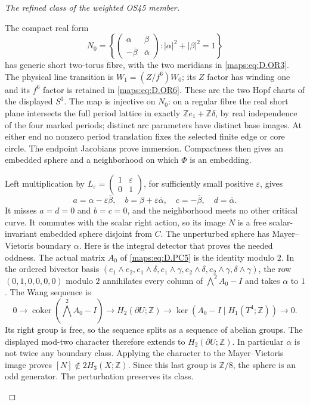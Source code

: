 \begin{proof}[The refined class of the weighted OS45 member]
\begin{enumerate}
The compact real form
\[
 N_0=\left\{
 \begin{pmatrix}\alpha&\beta\\-\overline\beta&\overline\alpha\end{pmatrix}:
 |\alpha|^2+|\beta|^2=1\right\}
 \tag{D.OR8}\label{maps:eq:D.OR8}
\]
has generic short two-torus fibre, with the two meridians in
\eqref{maps:eq:D.OR3}.  The physical line transition is
$W_1=(Z/f^6)W_0$; its $Z$ factor has winding one and its $f^6$ factor
is retained in \eqref{maps:eq:D.OR6}.  These are the two Hopf charts of
the displayed $S^3$.
The map is injective on $N_0$: on a regular fibre the real short plane
intersects the full period lattice in exactly
$\mathbb Ze_1+\mathbb Z\delta$, by real independence of the four marked
periods; distinct arc parameters have distinct base images.  At either
end no nonzero period translation fixes the selected finite edge or core
circle.  The endpoint Jacobians prove immersion.  Compactness then gives
an embedded sphere and a neighborhood on which $\Phi$ is an embedding.

Left multiplication by
$L_\varepsilon=\left(\begin{smallmatrix}1&\varepsilon\\0&1\end{smallmatrix}\right)$,
for sufficiently small positive $\varepsilon$, gives
\[
 a=\alpha-\varepsilon\overline\beta,\quad
 b=\beta+\varepsilon\overline\alpha,\quad
 c=-\overline\beta,\quad d=\overline\alpha.
 \tag{D.OR9}\label{maps:eq:D.OR9}
\]
It misses $a=d=0$ and $b=c=0$, and the neighborhood meets no other
critical curve.  It commutes with the scalar right action, so its image
$N$ is a free scalar-invariant embedded sphere disjoint from $C$.
The unperturbed sphere has Mayer--Vietoris boundary $\alpha$.
Here is the integral detector that proves the needed oddness.
The actual matrix $A_0$ of \eqref{maps:eq:D.PC5} is the identity modulo
$2$. In the ordered bivector basis
$(e_1\wedge e_2,e_1\wedge\delta,e_1\wedge\gamma,
 e_2\wedge\delta,e_2\wedge\gamma,\delta\wedge\gamma)$, the row
$(0,1,0,0,0,0)$ modulo $2$ annihilates every column of
$\bigwedge^2A_0-I$ and takes $\alpha$ to $1$.
The Wang sequence is
\[
0\longrightarrow\operatorname{coker}(\bigwedge^2A_0-I)
\longrightarrow H_2(\partial U;\mathbb Z)
\longrightarrow\ker(A_0-I\mid H_1(T^4;\mathbb Z))
\longrightarrow0.
\]
Its right group is free, so the sequence splits as a sequence of
abelian groups. The displayed mod-two character therefore extends
to $H_2(\partial U;\mathbb Z)$. In particular $\alpha$ is not twice
any boundary class. Applying the character to the Mayer--Vietoris
image proves $[N]\notin2H_3(X;\mathbb Z)$. Since this last group is
$\mathbb Z/8$, the sphere is an odd generator. The perturbation
preserves its class.


\end{enumerate}
\end{proof}
